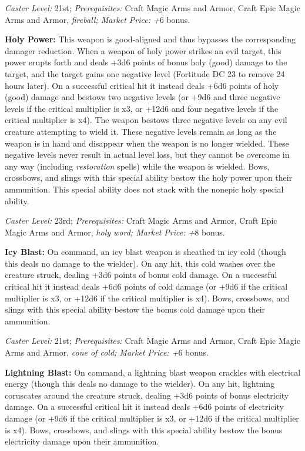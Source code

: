 \documentclass{article}
\begin{document}
\textit{Caster Level: }21st; \textit{Prerequisites: }Craft Magic Arms and Armor, 
Craft Epic Magic Arms and Armor, \textit{fireball; Market Price: +}6 bonus. 

\textbf{Holy Power: }This weapon is good-aligned and thus bypasses the corresponding 
damager reduction. When a weapon of holy power strikes an evil target, this power 
erupts forth and deals +3d6 points of bonus holy (good) damage to the target, and 
the target gains one negative level (Fortitude DC 23 to remove 24 hours later). 
On a successful critical hit it instead deals +6d6 points of holy (good) damage 
and bestows two negative levels (or +9d6 and three negative levels if the critical 
multiplier is x3, or +12d6 and four negative levels if the critical multiplier 
is x4). The weapon bestows three negative levels on any evil creature attempting 
to wield it. These negative levels remain as long as the weapon is in hand and 
disappear when the weapon is no longer wielded. These negative levels never result 
in actual level loss, but they cannot be overcome in any way (including \textit{restoration 
}spells) while the weapon is wielded. Bows, crossbows, and slings with this special 
ability bestow the holy power upon their ammunition. This special ability does 
not stack with the nonepic holy special ability.\textit{ }

\textit{Caster Level: }23rd; \textit{Prerequisites: }Craft Magic Arms and Armor, 
Craft Epic Magic Arms and Armor, \textit{holy word; Market Price: +}8 bonus. 

\textbf{Icy Blast: }On command, an icy blast weapon is sheathed in icy cold (though 
this deals no damage to the wielder). On any hit, this cold washes over the creature 
struck, dealing +3d6 points of bonus cold damage. On a successful critical hit 
it instead deals +6d6 points of cold damage (or +9d6 if the critical multiplier 
is x3, or +12d6 if the critical multiplier is x4). Bows, crossbows, and slings 
with this special ability bestow the bonus cold damage upon their ammunition. 

\textit{Caster Level: }21st; \textit{Prerequisites: }Craft Magic Arms and Armor, 
Craft Epic Magic Arms and Armor, \textit{cone of cold; Market Price: +}6 bonus. 

\textbf{Lightning Blast: }On command, a lightning blast weapon crackles with electrical 
energy (though this deals no damage to the wielder). On any hit, lightning coruscates 
around the creature struck, dealing  +3d6 points of bonus electricity damage. On 
a successful critical hit it instead deals +6d6 points of electricity damage (or 
+9d6 if the critical multiplier is x3, or +12d6 if the critical multiplier is x4). 
Bows, crossbows, and slings with this special ability bestow the bonus electricity 
damage upon their ammunition. 
\end{document}
